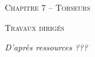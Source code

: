 \documentclass[10pt]{article}
\begin{document}

\begin{center}
\large{\textsc{Chapitre 7 -- Torseurs}}
\end{center}

\begin{center}
\textsc{Travaux dirigés}
\end{center}

\normalsize

\begin{flushright}
\textit{D'après ressources ???}
\end{flushright}

 \renewcommand{\baselinestretch}{1.2}
\end{document}
